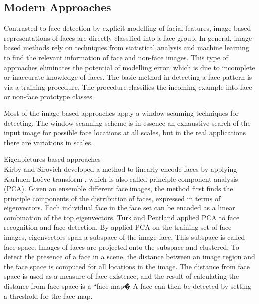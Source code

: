 \subsection{Modern Approaches}
Contrasted to face detection by explicit modelling of facial features, image-based representations of faces are directly classified into a face group. In general, image-based methods rely on techniques from statistical analysis and machine learning to find the relevant information of face and non-face images. This type of approaches eliminates the potential of modelling error, which is due to incomplete or inaccurate knowledge of faces. The basic method in detecting a face pattern is via a training procedure. The procedure classifies the incoming example into face or non-face prototype classes.

Most of the image-based approaches apply a window scanning techniques for detecting. The window scanning scheme is in essence an exhaustive search of the input image for possible face locations at all scales, but in the real applications there are variations in scales.

Eigenpictures based approaches\\
Kirby and Sirovich \cite{} developed a method to linearly encode faces by applying Karhuen-Loève transform \cite{}, which is also called principle component analysis (PCA). Given an ensemble different face images, the method first finds the principle components of the distribution of faces, expressed in terms of eigenvectors. Each individual face in the face set can be encoded as a linear combination of the top eigenvectors. Turk and Pentland \cite{} applied PCA to face recognition and face detection. By applied PCA on the training set of face images, eigenvectors span a subspace of the image face. This subspace is called face space. Images of faces are projected onto the subspace and clustered. To detect the presence of a face in a scene, the distance between an image region and the face space is computed for all locations in the image. The distance from face space is used as a measure of face existence, and the result of calculating the distance from face space is a “face map� A face can then be detected by setting a threshold for the face map. 

